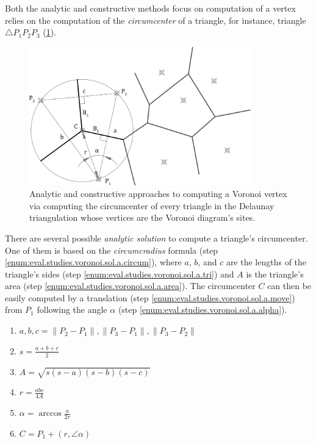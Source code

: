 Both the analytic and constructive methods focus on computation of a vertex
relies on the computation of the \textit{circumcenter} of a triangle, for
instance, triangle $\triangle P_1 P_2 P_3$
(\cref{fig:eval.studies.voronoi.sol}).

\begin{figure}[htb]
  \centering
  \includegraphics[height=6cm]{fig/voronoi-solution}
  \caption[Voronoi problem partial solution]{
    Analytic and constructive approaches to computing a Voronoi vertex via
    computing the circumcenter of every triangle in the Delaunay triangulation
    whose vertices are the Voronoi diagram's sites.}%
  \label{fig:eval.studies.voronoi.sol}
\end{figure}

There are several possible \textit{analytic solution} to compute a triangle's
circumcenter.  One of them is based on the \textit{circumcradius} formula (step
\ref{enum:eval.studies.voronoi.sol.a.circum}), where $a$, $b$, and $c$ are the
lengths of the triangle's sides (step
\ref{enum:eval.studies.voronoi.sol.a.tri}) and $A$ is the triangle's area (step
\ref{enum:eval.studies.voronoi.sol.a.area}).  The circumcenter $C$ can then be
easily computed by a translation (step
\ref{enum:eval.studies.voronoi.sol.a.move}) from $P_1$ following the angle
$\alpha$ (step \ref{enum:eval.studies.voronoi.sol.a.alpha}).

\begin{enumerate}
  \item $a, b, c = \lVert P_2 - P_1 \rVert, \lVert P_3 - P_1 \rVert, \lVert P_3
  - P_2 \rVert$
  \label{enum:eval.studies.voronoi.sol.a.tri}
  \item $s = \frac{a + b + c}{2}$
  \item $A = \sqrt{s(s - a)(s - b)(s - c)}$
  \label{enum:eval.studies.voronoi.sol.a.area}
  \item $r = \frac{abc}{4A}$
  \label{enum:eval.studies.voronoi.sol.a.circum}
  \item $\alpha = \arccos\frac{a}{2r}$
  \label{enum:eval.studies.voronoi.sol.a.alpha}
  \item $C = P_1 + \left(r, \angle\alpha\right)$
  \label{enum:eval.studies.voronoi.sol.a.move}
\end{enumerate}

